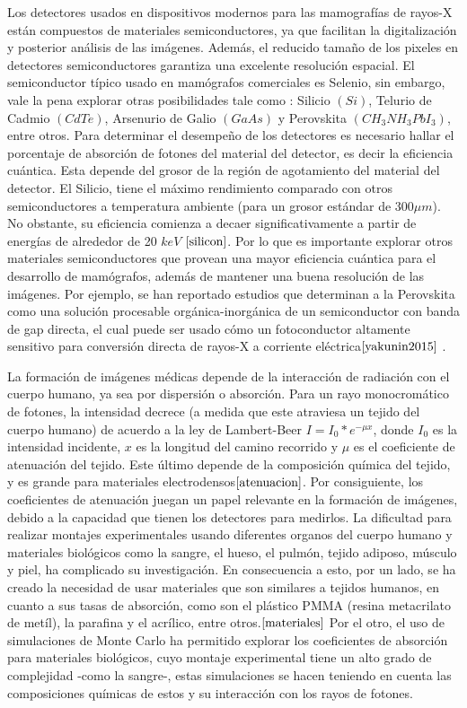 \documentclass[12pt]{article}
\begin{document}
Los detectores usados en dispositivos modernos para las mamografías de rayos-X están compuestos de materiales semiconductores, ya que facilitan la digitalización y posterior análisis de las imágenes. Además, el reducido tamaño de los pixeles en detectores semiconductores garantiza una excelente resolución espacial. El semiconductor típico usado en mamógrafos comerciales es Selenio, sin embargo, vale la pena explorar otras posibilidades tale como : Silicio $(Si)$, Telurio de Cadmio $(CdTe)$, Arsenurio de Galio $(GaAs)$ y Perovskita $(CH_{3}NH_{3}PbI_{3})$, entre otros.  Para determinar el desempeño de los detectores es necesario hallar el porcentaje de absorción de fotones del material del detector, es decir la eficiencia cuántica. Esta depende del grosor de la región de agotamiento del material del detector. El Silicio, tiene el máximo rendimiento comparado con otros semiconductores a temperatura ambiente (para un grosor estándar de 300$\mu m$). No obstante, su eficiencia comienza a decaer significativamente a partir de energías de alrededor de 20 $keV$ $\cite{silicon}$. Por lo que es importante explorar otros materiales semiconductores que provean una mayor eficiencia cuántica para el desarrollo de mamógrafos, además de mantener una buena resolución de las imágenes. Por ejemplo, se han reportado estudios que determinan a la Perovskita como una solución procesable orgánica-inorgánica de un semiconductor con banda de gap directa, el cual puede ser usado cómo un fotoconductor altamente sensitivo para conversión directa de rayos-X a corriente eléctrica$\cite{yakunin2015}$ . 
\vspace{3mm}

La formación de imágenes médicas depende de la interacción de radiación con el cuerpo humano, ya sea por dispersión o absorción. Para un rayo monocromático de fotones, la intensidad decrece (a medida que este atraviesa un tejido del cuerpo humano) de acuerdo a la ley de Lambert-Beer $I=I_0 * e^{-\mu x}$, donde $I_{0}$ es la intensidad incidente, $x$ es la longitud del camino recorrido y $\mu$ es el coeficiente de atenuación del tejido. Este último depende de la composición química del tejido, y es grande para materiales electrodensos$\cite{atenuacion}$. Por consiguiente, los coeficientes de atenuación juegan un papel relevante en la formación de imágenes, debido a la capacidad que tienen los detectores para medirlos. La dificultad para realizar montajes experimentales usando diferentes organos del cuerpo humano y materiales biológicos como la sangre, el hueso, el pulmón, tejido adiposo, músculo y piel,  ha complicado su investigación. En consecuencia a esto, por un lado, se ha creado la necesidad de usar materiales que son similares a tejidos humanos, en cuanto a sus tasas de absorción, como son el plástico PMMA (resina metacrilato de metíl), la parafina y el acrílico, entre otros.$\cite{materiales}$ Por el otro, el uso de simulaciones de Monte Carlo ha permitido explorar los coeficientes de absorción para materiales biológicos, cuyo montaje experimental tiene un alto grado de complejidad -como la sangre-, estas simulaciones se hacen teniendo en cuenta las composiciones químicas de estos y su interacción con los rayos de fotones. 
\vspace{3mm}
\end{document}
